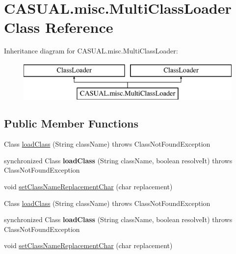 \hypertarget{class_c_a_s_u_a_l_1_1misc_1_1_multi_class_loader}{\section{C\-A\-S\-U\-A\-L.\-misc.\-Multi\-Class\-Loader Class Reference}
\label{class_c_a_s_u_a_l_1_1misc_1_1_multi_class_loader}
}
Inheritance diagram for C\-A\-S\-U\-A\-L.\-misc.\-Multi\-Class\-Loader\-:\begin{figure}[H]
\begin{center}
\leavevmode
\includegraphics[height=2.000000cm]{class_c_a_s_u_a_l_1_1misc_1_1_multi_class_loader}
\end{center}
\end{figure}
\subsection*{Public Member Functions}
\begin{DoxyCompactItemize}
\item 
Class \hyperlink{class_c_a_s_u_a_l_1_1misc_1_1_multi_class_loader_a55eb86977110bf1b756eb0d3fb4fd94e}{load\-Class} (String class\-Name)  throws Class\-Not\-Found\-Exception 
\item 
\hypertarget{class_c_a_s_u_a_l_1_1misc_1_1_multi_class_loader_abff00159b724689d0be2e0b927a591b4}{synchronized Class {\bfseries load\-Class} (String class\-Name, boolean resolve\-It)  throws Class\-Not\-Found\-Exception }\label{class_c_a_s_u_a_l_1_1misc_1_1_multi_class_loader_abff00159b724689d0be2e0b927a591b4}

\item 
void \hyperlink{class_c_a_s_u_a_l_1_1misc_1_1_multi_class_loader_a185926422f007e59628c04e199596b36}{set\-Class\-Name\-Replacement\-Char} (char replacement)
\item 
Class \hyperlink{class_c_a_s_u_a_l_1_1misc_1_1_multi_class_loader_a55eb86977110bf1b756eb0d3fb4fd94e}{load\-Class} (String class\-Name)  throws Class\-Not\-Found\-Exception 
\item 
\hypertarget{class_c_a_s_u_a_l_1_1misc_1_1_multi_class_loader_abff00159b724689d0be2e0b927a591b4}{synchronized Class {\bfseries load\-Class} (String class\-Name, boolean resolve\-It)  throws Class\-Not\-Found\-Exception }\label{class_c_a_s_u_a_l_1_1misc_1_1_multi_class_loader_abff00159b724689d0be2e0b927a591b4}

\item 
void \hyperlink{class_c_a_s_u_a_l_1_1misc_1_1_multi_class_loader_a185926422f007e59628c04e199596b36}{set\-Class\-Name\-Replacement\-Char} (char replacement)
\end{DoxyCompactItemize}
